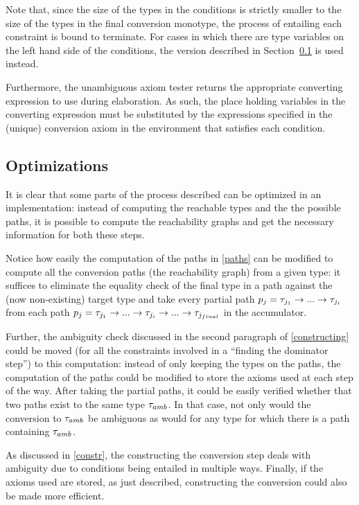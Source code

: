 Note that, since the size of the types in the conditions is strictly smaller to the size of the types in the final conversion monotype, the process of entailing each constraint is bound to terminate. For cases in which there are type variables on the left hand side of the conditions, the version described in Section~\ref{opt} is used instead.

Furthermore, the unambiguous axiom tester returns the appropriate converting expression to use during elaboration. As such, the place holding variables in the converting expression must be substituted by the expressions specified in the (unique) conversion axiom in the environment that satisfies each condition.

\subsection{Optimizations}
\label{opt}

It is clear that some parts of the process described can be optimized in an implementation: instead of computing the reachable types and the the possible paths, it is possible to compute the reachability graphs and get the necessary information for both these steps.

Notice how easily the computation of the paths in \ref{paths} can be modified to compute all the conversion paths (the reachability graph) from a given type: it suffices to eliminate the equality check of the final type in a path against the (now non-existing) target type and take every partial path $p_j = \mathit{\tau}_{j_1}\to ... \to \mathit{\tau}_{j_i}$ from each path $p_j = \mathit{\tau}_{j_1}\to ... \to \mathit{\tau}_{j_i} \to ... \to \mathit{\tau}_{j_{final}}$ in the accumulator.

Further, the ambiguity check discussed in the second paragraph of \ref{constructing} could be moved (for all the constraints involved in a ``finding the dominator step'') to this computation: instead of only keeping the types on the paths, the computation of the paths could be modified to store the axioms used at each step of the way. After taking the partial paths, it could be easily verified whether that two paths exist to the same type $\mathit{\tau}_{amb}$. In that case, not only would the conversion to $\mathit{\tau}_{amb}$ be ambiguous as would for any type for which there is a path containing $\mathit{\tau}_{amb}$.

As discussed in \ref{constr}, the constructing the conversion step deals with ambiguity due to conditions being entailed in multiple ways. Finally, if the axioms used are stored, as just described, constructing the conversion could also be made more efficient.



